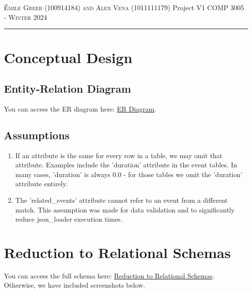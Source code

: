 \documentclass[12pt]{article}
\begin{document}
\thispagestyle{empty}

{\scshape Émile Greer (100914184) and Alex Vena (1011111179)} \hfill {Project V1 \scshape \large} \hfill {\scshape COMP 3005 - Winter 2024}
 
\smallskip
\hrule
\bigskip

\section*{Conceptual Design}
\subsection*{Entity-Relation Diagram}
You can access the ER diagram here: \href{https://dbdiagram.io/d/ER-Diagram-661b1d7d03593b6b61ec588d}{ER Diagram}.


\subsection*{Assumptions}
\begin{enumerate}
    \item If an attribute is the same for every row in a table, we may omit that attribute. Examples include the 'duration' attribute in the event tables. In many cases, 'duration' is always 0.0 - for those tables we omit the 'duration' attribute entirely.
    \item The 'related\_events' attribute cannot refer to an event from a different match. This assumption was made for data validation and to significantly reduce json\_loader execution times.
\end{enumerate}

\section*{Reduction to Relational Schemas}
You can access the full schema here: \href{https://dbdiagram.io/d/soccer_schema-66196f2f03593b6b61de1763}{Reduction to Relational Schemas}. Otherwise, we have included screenshots below.
\smallskip
\end{document}
